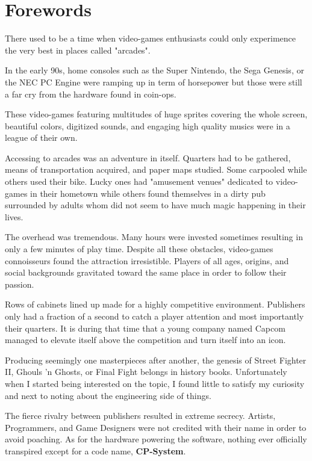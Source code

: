 \chapter*{Forewords}

There used to be a time when video-games enthusiasts could only experimence the very best in places called "arcades". 

In the early 90s, home consoles such as the Super Nintendo, the Sega Genesis, or the NEC PC Engine were ramping up in term of horsepower but those were still a far cry from the hardware found in coin-ops.

These video-games featuring multitudes of huge sprites covering the whole screen, beautiful colors, digitized sounds, and engaging high quality musics were in a league of their own.

Accessing to arcades was an adventure in itself. Quarters had to be gathered, means of transportation acquired, and paper maps studied. Some carpooled while others used their bike. Lucky ones had "amusement venues" dedicated to video-games in their hometown while others found themselves in a dirty pub surrounded by adults whom did not seem to have much magic happening in their lives. 

The overhead was tremendous. Many hours were invested sometimes resulting in only a few minutes of play time. Despite all these obstacles, video-games connoisseurs found the attraction irresistible. Players of all ages, origins, and social backgrounds gravitated toward the same place in order to follow their passion. 

Rows of cabinets lined up made for a highly competitive environment. Publishers only had a fraction of a second to catch a player attention and most importantly their quarters. It is during that time that a young company named Capcom  managed to elevate itself above the competition and turn itself into an icon.

Producing seemingly one masterpieces after another, the genesis of Street Fighter II, Ghouls 'n Ghosts, or Final Fight belongs in history books. Unfortunately when I started being interested on the topic, I found little to satisfy my curiosity and next to noting about the engineering side of things. 

The fierce rivalry between publishers resulted in extreme secrecy. Artists, Programmers, and Game Designers were not credited with their name in order to avoid poaching. As for the hardware powering the software, nothing ever officially transpired except for a code name, \textbf{CP-System}.

